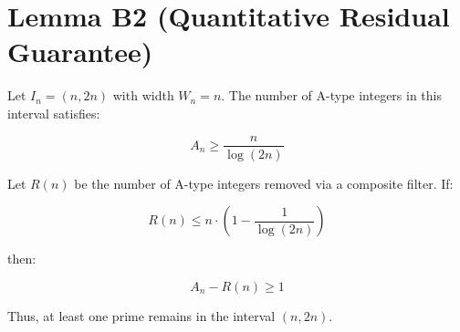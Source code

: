 
\section*{Lemma B2 (Quantitative Residual Guarantee)}

Let \( I_n = (n, 2n) \) with width \( W_n = n \).  
The number of A-type integers in this interval satisfies:

\[
A_n \geq \frac{n}{\log(2n)}
\]

Let \( R(n) \) be the number of A-type integers removed via a composite filter.  
If:

\[
R(n) \leq n \cdot \left(1 - \frac{1}{\log(2n)}\right)
\]

then:

\[
A_n - R(n) \geq 1
\]

Thus, at least one prime remains in the interval \( (n, 2n) \).
